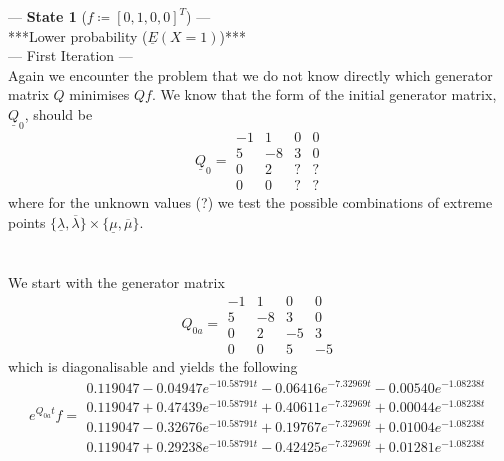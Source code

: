 \documentclass{article}
\begin{document}
--- \textbf{State 1} ($f\coloneqq[0,1,0,0]^T$) ---\\

***Lower probability ($\underline{E}(X=1)$)***\\

--- First Iteration ---\\
Again we encounter the problem that we do not know directly which generator matrix $Q$ minimises $Qf$.
We know that the form of the initial generator matrix, $\underline{Q}_{0}$, should be
\begin{equation*} 
 \underline{Q}_{0}= 
 \begin{array}{|rrrr|}
  -1 & 1 & 0 & 0 \\
  5 & -8 & 3 & 0 \\
  0 & 2 & ? & ? \\
  0 & 0 & ? & ? 
 \end{array}
 \end{equation*}
 where for the unknown values (?) we test the possible combinations of extreme points $\{\underline{\lambda},\overline{\lambda}\}\times\{\underline{\mu},\overline{\mu}\}$.\\\\\\
We start with the generator matrix 
\begin{equation*} 
 Q_{0a}= 
 \begin{array}{|rrrr|}
  -1 & 1 & 0 & 0 \\
  5 & -8 & 3 & 0 \\
  0 & 2 & -5 & 3 \\
  0 & 0 & 5 & -5 
 \end{array}
 \end{equation*}
which is diagonalisable and yields the following
\begin{equation*} 
 e^{Q_{0a}t}f= 
 \begin{array}{|r|}
  0.119047-0.04947e^{-10.58791t}-0.06416e^{-7.32969t}-0.00540e^{-1.08238t}\\
  0.119047+0.47439e^{-10.58791t}+0.40611e^{-7.32969t}+ 0.00044e^{-1.08238t}  \\
  0.119047-0.32676e^{-10.58791t}+ 0.19767e^{-7.32969t}+ 0.01004e^{-1.08238t}  \\
  0.119047+0.29238e^{-10.58791t}- 0.42425e^{-7.32969t}+ 0.01281e^{-1.08238t}  
 \end{array}
 \end{equation*}
\end{document}
